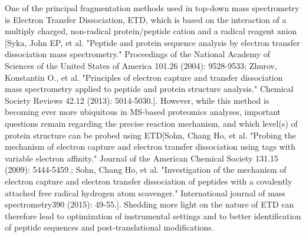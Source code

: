 \documentclass{llncs}
\begin{document}
        One of the principal fragmentation methods used in top-down mass spectrometry is Electron Transfer Dissociation, ETD, which is based on the interaction of a multiply charged, non-radical protein/peptide cation and a radical reagent anion \cite{} [Syka, John EP, et al. "Peptide and protein sequence analysis by electron transfer dissociation mass spectrometry." Proceedings of the National Academy of Sciences of the United States of America 101.26 (2004): 9528-9533; Zhurov, Konstantin O., et al. "Principles of electron capture and transfer dissociation mass spectrometry applied to peptide and protein structure analysis." Chemical Society Reviews 42.12 (2013): 5014-5030.]. However, while this method is becoming ever more ubiquitous in MS-based proteomics analyses, important questions remain regarding the precise reaction mechanism, and which level(s) of protein structure can be probed using ETD[Sohn, Chang Ho, et al. "Probing the mechanism of electron capture and electron transfer dissociation using tags with variable electron affinity." Journal of the American Chemical Society 131.15 (2009): 5444-5459.; Sohn, Chang Ho, et al. "Investigation of the mechanism of electron capture and electron transfer dissociation of peptides with a covalently attached free radical hydrogen atom scavenger." International journal of mass spectrometry390 (2015): 49-55.]. Shedding more light on the nature of ETD can therefore lead to optimization of instrumental settings and to better identification of peptide sequences and post-translational modifications.
\end{document}
